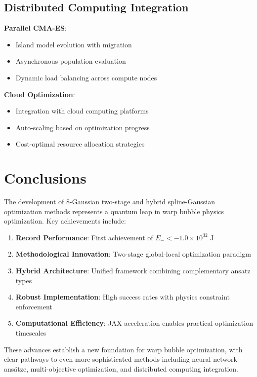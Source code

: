 \documentclass[11pt,a4paper]{article}
\begin{document}
\subsection{Distributed Computing Integration}

\textbf{Parallel CMA-ES}:
\begin{itemize}
\item Island model evolution with migration
\item Asynchronous population evaluation
\item Dynamic load balancing across compute nodes
\end{itemize}

\textbf{Cloud Optimization}:
\begin{itemize}
\item Integration with cloud computing platforms
\item Auto-scaling based on optimization progress
\item Cost-optimal resource allocation strategies
\end{itemize}

\section{Conclusions}

The development of 8-Gaussian two-stage and hybrid spline-Gaussian optimization methods represents a quantum leap in warp bubble physics optimization. Key achievements include:

\begin{enumerate}
\item \textbf{Record Performance}: First achievement of $E_- < -1.0 \times 10^{32}$ J
\item \textbf{Methodological Innovation}: Two-stage global-local optimization paradigm
\item \textbf{Hybrid Architecture}: Unified framework combining complementary ansatz types
\item \textbf{Robust Implementation}: High success rates with physics constraint enforcement
\item \textbf{Computational Efficiency}: JAX acceleration enables practical optimization timescales
\end{enumerate}

These advances establish a new foundation for warp bubble optimization, with clear pathways to even more sophisticated methods including neural network ansätze, multi-objective optimization, and distributed computing integration.
\end{document}
